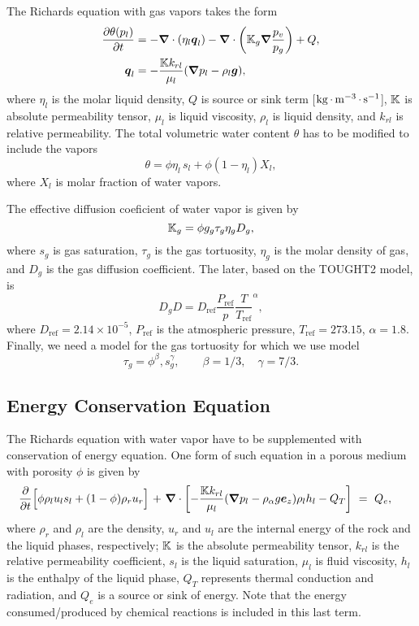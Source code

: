 The Richards equation with gas vapors takes the form
\begin{subequations}\label{eq:Richards with vapors}
\begin{align}
  \frac{\partial \theta(p_l)}{\partial t} 
  &= 
  -{\boldsymbol{\nabla}} \cdot (\eta_l {\boldsymbol{q}}_l)
  -{\boldsymbol{\nabla}} \cdot \left( {\mathbb K}_g {\boldsymbol{\nabla}} \frac{p_v}{p_g} \right) 
  + Q,
  \\
  {\boldsymbol{q}}_l 
  &= 
  -\frac{{\mathbb K} k_{rl}}{\mu_l} ({\boldsymbol{\nabla}} p_l - \rho_l {\boldsymbol{g}}),
\end{align}
\end{subequations}
where 
$\eta_l$ is the molar liquid density,
$Q$ is source or sink term [${\rm kg} {\,\cdot\,} {\rm m}^{-3} {\,\cdot\,} {\rm s}^{-1}$],
${\mathbb K}$ is absolute permeability tensor,
$\mu_l$ is liquid viscosity,
$\rho_l$ is liquid density, and
$k_{rl}$ is relative permeability.
The total volumetric water content $\theta$ has to be modified to include 
the vapors
$$
  \theta = \phi \eta_l\, s_l + \phi (1-\eta_l) X_l,
$$
where $X_l$ is molar fraction of water vapors.

The effective diffusion coeficient of water vapor is given by 
\[
  {\mathbb K}_g = \phi g_g \tau_g \eta_g D_g,
\]
where $s_g$ is gas saturation, 
$\tau_g$ is the gas tortuosity,
$\eta_g$ is the molar density of gas, and 
$D_g$ is the gas diffusion coefficient.
The later, based on the TOUGHT2 model, is 
\[
  D_g D = D_\text{ref} \frac{P_\text{ref}}{p} \frac{T}{T_\text{ref}}^\alpha,
\]
where 
$D_\text{ref} = 2.14\times 10^{-5}$,
$P_\text{ref}$ is the atmospheric pressure,
$T_\text{ref} = 273.15$,
$\alpha=1.8$.
Finally, we need a model for the gas tortuosity
for which we use \citet{millington1961permeability} 
model
\[
  \tau_g = \phi^\beta, s_g^\gamma,
  \qquad \beta = 1/3, \quad \gamma = 7/3.
\]








\subsection{Energy Conservation Equation}
\label{sec:Energy}

The Richards equation with water vapor have to be supplemented with conservation of energy equation.
One form of such equation in a porous medium with porosity $\phi$ is given by
\begin{align}
\label{eq:energy_balance}
  \frac{\partial}{\partial t} \Big[ 
  \phi \rho_l u_l s_l
  + 
  (1-\phi )\rho_r u_r 
  \Big] \ 
  + \ &
  \boldsymbol{\nabla} \cdot \left[ 
  -\frac{\K k_{rl} }{\mu _l } (\boldsymbol{\nabla} p_l 
  -
  \rho _{\alpha} g \boldsymbol{e}_z)\rho _l h_l 
  - 
  Q_T 
  \right] 
  \eq 
  Q_e,
\end{align}
where
$\rho_{r}$ and $\rho_{l}$ are the density, 
$u_{r}$ and $u_l$ are the internal energy 
of the rock and the liquid phases, respectively;
${\mathbb K}$ is the absolute permeability tensor,
$k_{rl}$ is the relative permeability coefficient,
$s_l$ is the liquid saturation,
$\mu_l$ is fluid viscosity,
$h_l$ is the enthalpy of the liquid phase, 
$Q_T$ represents thermal conduction and radiation, and 
$Q_{e} $ is a source or sink of energy. 
Note that the energy consumed/produced by chemical reactions is included in this last term. 

